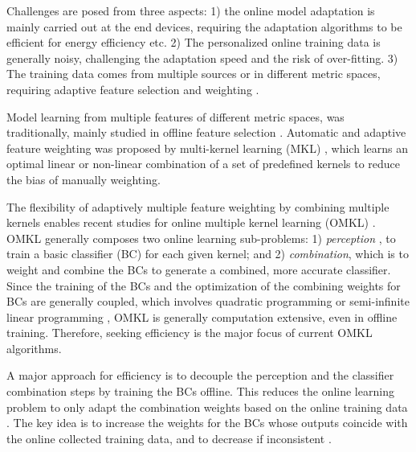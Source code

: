 \documentclass[letterpaper]{article}
\begin{document}
Challenges are posed from three aspects: 1) the online model adaptation is mainly carried out at the end devices, requiring the adaptation algorithms to be efficient for energy efficiency etc. 2) The personalized online training data is generally noisy, challenging the adaptation speed and the risk of over-fitting.
 3) The training data comes from multiple sources or in different metric spaces, requiring adaptive feature selection and weighting \cite{hong2009context}.



Model learning from multiple features of different metric spaces, was traditionally, mainly studied  in offline feature selection \cite{6788385} \cite{Huang2005325}. %
Automatic and adaptive feature weighting was proposed by multi-kernel learning (MKL)\cite{Sonnenburg:2006} \cite{Gonen:2011}, which learns an optimal linear or non-linear combination of a set of predefined kernels to reduce the bias of manually weighting.

The flexibility of adaptively multiple feature weighting by combining multiple kernels enables recent studies for online multiple kernel learning (OMKL) \cite{martins2011online}\cite{Hoi2012}\cite{Wang2015124}. OMKL generally composes two online learning sub-problems: 1) \emph{perception} \cite{Freund:1999:LMC:337859.337869} , to train a basic classifier (BC) for each given kernel; and 2) \emph{combination}, which is to weight and combine the BCs to generate a combined, more accurate classifier. Since the training of the BCs and the optimization of the combining weights for BCs are generally coupled, which involves quadratic programming\cite{Lanckriet01112004} or semi-infinite linear programming \cite{Sonnenburg:2006}\cite{Rakotomamonjy:2007}, OMKL is generally computation extensive,  even in offline training. Therefore, seeking efficiency is the major focus of current OMKL algorithms.


A major approach for efficiency is to decouple the perception and the classifier combination steps by training the BCs offline. This reduces the online learning problem to only adapt the combination weights based on the online training data \cite{Incremental} \cite{Luo} \cite{jin2010}. The key idea is to increase the weights for the BCs whose outputs coincide with the online collected training data, and to decrease if inconsistent \cite{chaudhuri2009parameter}\cite{Incremental}. %
\end{document}
